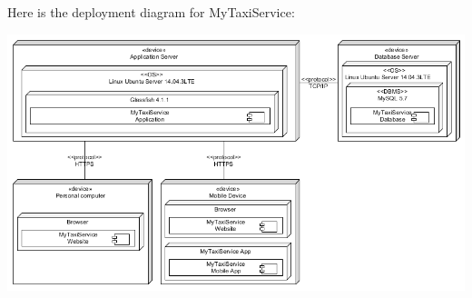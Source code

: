 Here is the deployment diagram for MyTaxiService:
\begin{center}
	\includegraphics[width=\textwidth]{diagrams/deployment.png}
\end{center}